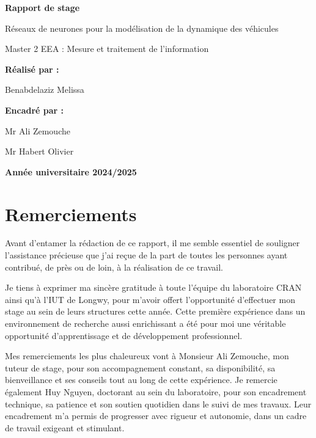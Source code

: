 \documentclass[12pt, a4paper]{report}
\begin{document}
\begingroup
\AddToShipoutPicture*{} 
\thispagestyle{empty}   
\begin{titlepage}
  \centering
  \vspace*{1cm}
  {\Huge\bfseries Rapport de stage\par}
  \vspace{1.5cm}
  {\LARGE Réseaux de neurones  pour la modélisation de la dynamique des véhicules\par}
  \vspace{2cm}
  {\Large Master 2 EEA : Mesure et traitement de l'information\par}
  \vspace{2cm}
  {\Large\bfseries Réalisé par :\par}
  {\Large Benabdelaziz Melissa\par}
  \vspace{1cm}
  {\Large\bfseries Encadré par :\par}
  {\Large Mr Ali Zemouche \par}
  {\Large Mr Habert Olivier\par}
  \vspace{1.5cm}
  {\Large\bfseries Année universitaire 2024/2025\par}
  \vfill
\end{titlepage}
\endgroup



\chapter*{Remerciements}
\thispagestyle{fancy}

Avant d’entamer la rédaction de ce rapport, il me semble essentiel de souligner l’assistance précieuse que j’ai reçue de la part de toutes les personnes ayant contribué, de près ou de loin, à la réalisation de ce travail.

Je tiens à exprimer ma sincère gratitude à toute l’équipe du laboratoire CRAN ainsi qu’à l’IUT de Longwy, pour m’avoir offert l’opportunité d’effectuer mon stage au sein de leurs structures cette année. Cette première expérience dans un environnement de recherche aussi enrichissant a été pour moi une véritable opportunité d’apprentissage et de développement professionnel.

Mes remerciements les plus chaleureux vont à Monsieur Ali Zemouche, mon tuteur de stage, pour son accompagnement constant, sa disponibilité, sa bienveillance et ses conseils tout au long de cette expérience. Je remercie également Huy Nguyen, doctorant au sein du laboratoire, pour son encadrement technique, sa patience et son soutien quotidien dans le suivi de mes travaux. Leur encadrement m’a permis de progresser avec rigueur et autonomie, dans un cadre de travail exigeant et stimulant.
\end{document}
